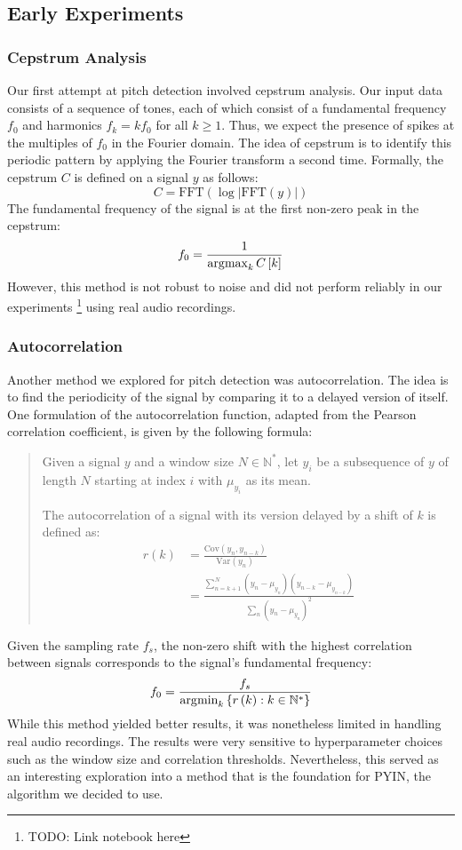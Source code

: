 \subsection{Early Experiments}
\label{sec:experiments}

\subsubsection{Cepstrum Analysis}

Our first attempt at pitch detection involved cepstrum analysis. Our input data consists of a sequence of tones, each of which consist of a fundamental frequency $f_0$ and harmonics $f_k = k f_0$ for all $k \geq 1$. Thus, we expect the presence of spikes at the multiples of $f_0$ in the Fourier domain. The idea of cepstrum is to identify this periodic pattern by applying the Fourier transform a second time. Formally, the cepstrum $C$ is defined on a signal $y$ as follows:
$$C = \text{FFT}\left(\log\left|\text{FFT}\left(y\right)\right|\right)$$
The fundamental frequency of the signal is at the first non-zero peak in the cepstrum:
$$f_0 = \frac{1}{\operatorname*{\arg\!\max}_{k} C\left[k\right]}$$
However, this method is not robust to noise and did not perform reliably in our experiments \footnote{TODO: Link notebook here} using real audio recordings.

\subsubsection{Autocorrelation}

Another method we explored for pitch detection was autocorrelation. The idea is to find the periodicity of the signal by comparing it to a delayed version of itself. One formulation of the autocorrelation function, adapted from the Pearson correlation coefficient, is given by the following formula:
\begin{quote}
    Given a signal $y$ and a window size $N \in \mathbb N^\ast$, let $y_i$ be a subsequence of $y$ of length $N$ starting at index $i$ with $\mu_{y_i}$ as its mean.

    The autocorrelation of a signal with its version delayed by a shift of $k$ is defined as:
    \begin{align*}
        r\left(k\right)
        &= \frac{\text{Cov}\left(y_n, y_{n-k}\right)}{\text{Var}\left(y_n\right)} \\
        &= \frac{\sum_{n=k+1}^N \left(y_n - \mu_{y_n}\right) \left(y_{n-k} - \mu_{y_{n-k}}\right)}{\sum_n \left(y_n - \mu_{y_n}\right)^2}
    \end{align*}
\end{quote}
Given the sampling rate $f_s$, the non-zero shift with the highest correlation between signals corresponds to the signal's fundamental frequency:
$$f_0 = \frac{f_s}{\operatorname*{\arg\!\min}_{k}\left\{ r\left(k\right) : k \in \mathbb N^\ast \right\}}$$
While this method yielded better results, it was nonetheless limited in handling real audio recordings. The results were very sensitive to hyperparameter choices such as the window size and correlation thresholds. Nevertheless, this served as an interesting exploration into a method that is the foundation for PYIN, the algorithm we decided to use.

